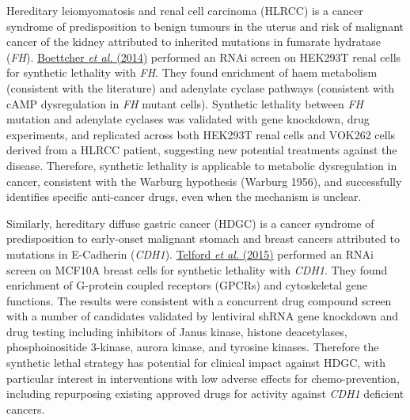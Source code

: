 Hereditary leiomyomatosis and renal cell carcinoma (HLRCC) is a cancer syndrome of predisposition to benign tumours in the uterus and risk of malignant cancer of the kidney attributed to inherited mutations in fumarate hydratase (\textit{FH}). \hyperlink{ENREF14}{Boettcher}\hyperlink{ENREF14}{\textit{ et al.}}\hyperlink{ENREF14}{ (2014)} performed an RNAi screen on HEK293T renal cells for synthetic lethality with \textit{FH}. They found enrichment of haem metabolism (consistent with the literature) and adenylate cyclase pathways (consistent with cAMP dysregulation in \textit{FH} mutant cells). Synthetic lethality between \textit{FH} mutation and adenylate cyclases was validated with gene knockdown, drug experiments, and replicated across both HEK293T renal cells and VOK262 cells derived from a HLRCC patient, suggesting new potential treatments against the disease. Therefore, synthetic lethality is applicable to metabolic dysregulation in cancer, consistent with the Warburg hypothesis (Warburg 1956), and successfully identifies specific anti-cancer drugs, even when the mechanism is unclear. 

Similarly, hereditary diffuse gastric cancer (HDGC) is a cancer syndrome of predisposition to early-onset malignant stomach and breast cancers attributed to mutations in E-Cadherin (\textit{CDH1}). \hyperlink{ENREF94}{Telford}\hyperlink{ENREF94}{\textit{ et al.}}\hyperlink{ENREF94}{ (2015)} performed an RNAi screen on MCF10A breast cells for synthetic lethality with \textit{CDH1}. They found enrichment of G-protein coupled receptors (GPCRs) and cytoskeletal gene functions. The results were consistent with a concurrent drug compound screen with a number of candidates validated by lentiviral shRNA gene knockdown and drug testing including inhibitors of Janus kinase, histone deacetylases, phosphoinositide 3-kinase, aurora kinase, and tyrosine kinases. Therefore the synthetic lethal strategy has potential for clinical impact against HDGC, with particular interest in interventions with low adverse effects for chemo-prevention, including repurposing existing approved drugs for activity against \textit{CDH1} deficient cancers.  

